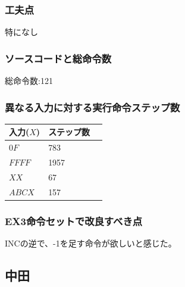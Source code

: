 \documentclass[dvipdfmx,12pt]{jreport}
\begin{document}
\subsubsection{工夫点}
特になし

\subsubsection{ソースコードと総命令数}

総命令数:121

\subsubsection{異なる入力に対する実行命令ステップ数}
\begin{table}[h]
  \begin{tabular}{|l|l|l|} \hline
    入力($X$) & ステップ数 \\ \hline
    $0F$ & 783 \\ \hline
    $FFFF$ & 1957 \\ \hline
    $XX$ & 67 \\ \hline
    $ABCX$ & 157 \\ \hline
  \end{tabular}
\end{table}

\subsubsection{EX3命令セットで改良すべき点}
INCの逆で、-1を足す命令が欲しいと感じた。

\subsection*{中田}
\end{document}
